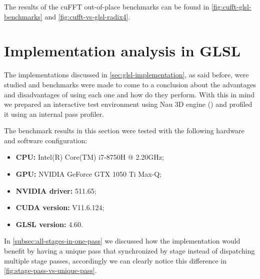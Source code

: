 \documentclass[
  oneside,
  11pt, a4paper,
  footinclude=true,
  headinclude=true,
  cleardoublepage=empty
]{scrbook}
\begin{document}
The results of the cuFFT out-of-place benchmarks can be found in \autoref{fig:cufft-glsl-benchmarks} and \autoref{fig:cufft-vs-glsl-radix4}.

\section{Implementation analysis in GLSL} \label{sec:implementation-analysis-in-glsl}

The implementations discussed in \autoref{sec:glsl-implementation}, as said before, were studied and benchmarks were made to come to a conclusion about the advantages and disadvantages of using each one and how do they perform. With this in mind we prepared an interactive test environment using Nau 3D engine (\cite{nau3d}) and profiled it using an internal pass profiler.

The benchmark results in this section were tested with the following hardware and software configuration:

\begin{itemize} \label{itm:benchmark-conditions}
    \item \textbf{CPU:} Intel(R) Core(TM) i7-8750H @ 2.20GHz;
    \item \textbf{GPU:} NVIDIA GeForce GTX 1050 Ti Max-Q;
    \item \textbf{NVIDIA driver:} 511.65;
    \item \textbf{CUDA version:}  V11.6.124;
    \item \textbf{GLSL version:}  4.60.
\end{itemize}

In \autoref{subsec:all-stages-in-one-pass} we discussed how the implementation would benefit by having a unique pass that synchronized by stage instead of dispatching multiple stage passes, accordingly we can clearly notice this difference in \autoref{fig:stage-pass-vs-unique-pass}.
\end{document}
